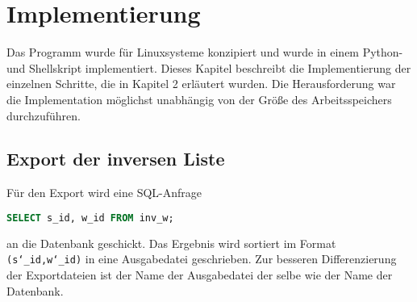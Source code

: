 \documentclass[a4paper,11pt,utf8]{scrartcl}
\begin{document}
\section{Implementierung}

Das Programm wurde für Linuxsysteme konzipiert und wurde in einem Python- und Shellskript implementiert. Dieses Kapitel beschreibt die Implementierung der einzelnen Schritte, die in Kapitel 2 erläutert wurden. Die Herausforderung war die Implementation möglichst unabhängig von der Größe des Arbeitsspeichers durchzuführen. 

\subsection{Export der inversen Liste}
Für den Export wird eine SQL-Anfrage 
\begin{lstlisting}[language=SQL]
SELECT s_id, w_id FROM inv_w;
\end{lstlisting} an die Datenbank geschickt. Das Ergebnis wird sortiert im Format \texttt{(s\char`_id,w\char`_id)} in eine Ausgabedatei geschrieben. Zur besseren Differenzierung der Exportdateien ist der Name der Ausgabedatei der selbe wie der Name der Datenbank.
\end{document}

